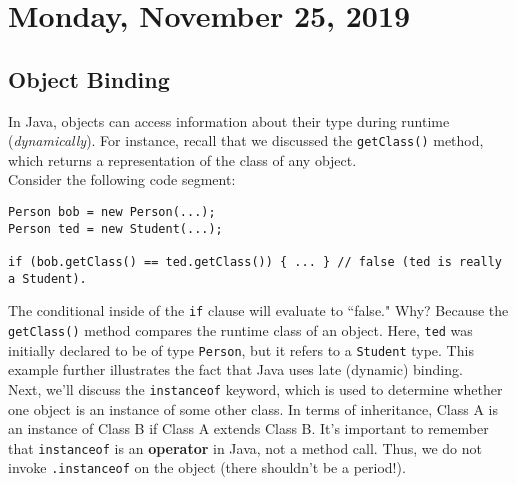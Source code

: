 \section{Monday, November 25, 2019}

\subsection{Object Binding}

In Java, objects can access information about their type during runtime (\textit{dynamically}). For instance, recall that we discussed the \verb!getClass()! method, which returns a representation of the class of any object. \\

Consider the following code segment:

\begin{lstlisting}
Person bob = new Person(...);
Person ted = new Student(...);

if (bob.getClass() == ted.getClass()) { ... } // false (ted is really a Student).
\end{lstlisting}

The conditional inside of the \verb!if! clause will evaluate to ``false." Why? Because the \verb!getClass()! method compares the runtime class of an object. Here, \verb!ted! was initially declared to be of type \verb!Person!, but it refers to a \verb!Student! type. This example further illustrates the fact that Java uses late (dynamic) binding. \\

Next, we'll discuss the \verb!instanceof! keyword, which is used to determine whether one object is an instance of some other class. In terms of inheritance, Class A is an instance of Class B if Class A extends Class B. It's important to remember that \verb!instanceof! is an \textbf{operator} in Java, not a method call. Thus, we do not invoke \verb!.instanceof! on the object (there shouldn't be a period!).

